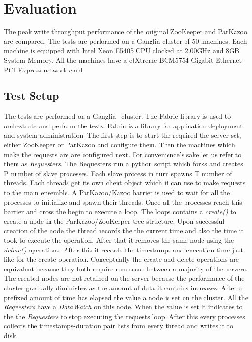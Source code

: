\chapter{Evaluation}

The peak write throughput performance of the original ZooKeeper and ParKazoo are compared. The tests are performed on a Ganglia cluster of 50 machines. Each machine is equipped with Intel\textsuperscript{\textregistered}  Xeon\textsuperscript{\texttrademark}  E5405 CPU clocked at 2.00GHz and 8GB System Memory. All the machines have a etXtreme BCM5754 Gigabit Ethernet PCI Express network card.

\section{Test Setup}
The tests are performed on a Ganglia~\cite{sacerdoti2003wide} cluster. The Fabric library is used to orchestrate and perform the tests. Fabric is a library for application deployment~\cite{spotswood2003systems} and system administration. The first step is to start the required the server set, either ZooKeeper or ParKazoo and configure them. Then the machines which make the requests are are configured next. For convenience's sake let us refer to them as \textit{Requesters}. The Requesters run a python script which forks and creates P number of slave processes. Each slave process in turn spawns T number of threads. Each threads get its own client object which it can use to make requests to the main ensemble. A ParKazoo/Kazoo barrier is used to wait for all the processes to initialize and spawn their threads. Once all the processes reach this barrier and cross the begin to execute a loop. The loops contains a \textit{create()} to create a node in the ParKazoo/ZooKeeper tree structure. Upon successful creation of the node the thread records the the current time and also the time it took to execute the operation. After that it removes the same node using the \textit{delete()} operations. After this it records the timestamps and execution time just like for the create operation. Conceptually the create and delete operations are equivalent because they both require consensus between a majority of the servers. The created nodes are not retained on the server because the performance of the cluster gradually diminishes as the amount of data it contains increases. After a prefixed amount of time has elapsed the value a node is set on the cluster. All the \textit{Requesters} have a \textit{DataWatch} on this node. When the value is set it indicates to the the \textit{Requesters} to stop executing the requests loop. After this every processes collects the timestamps-duration pair lists from every thread and writes it to disk. 

